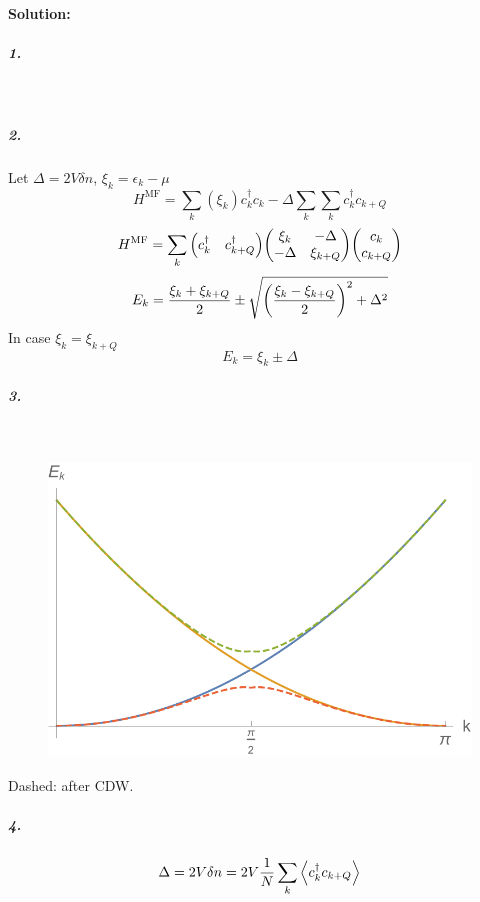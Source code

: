 \documentclass[a4paper]{article}
\DeclareMathOperator{\MF}{\text{MF}}
\numberwithin{equation}{section}
\begin{document}
\paragraph{Solution:}
\subparagraph{1.}
~\vspace{70pt}\\
\subparagraph{2.}
Let $ \Delta = 2V\delta n $, $ \xi_k = \epsilon_k - \mu $
\begin{equation}\label{key}
	H^{\MF} = \sum_k (\xi_k) c_k^\dagger c_k - \Delta \sum_k  \sum_k c_k^\dagger c_{k+Q}
\end{equation}
\begin{equation}\label{key}
	H^{\MF} = \sum_k \mqty(c_k^\dagger & c_{k+Q}^\dagger) 
		\mqty(\xi_k & -\Delta\\ - \Delta & \xi_{k+Q} ) 
		\mqty(c_k \\ c_{k+Q}) 
\end{equation}
\begin{equation}\label{key}
	E_k = \dfrac{\xi_k + \xi_{k+Q}}{2} \pm \sqrt{\qty( \dfrac{\xi_k - \xi_{k+Q}}{2} )^2 + \Delta^2}
\end{equation}
In case $ \xi_k = \xi_{k+Q} $
\begin{equation}\label{key}
	E_k = \xi_k \pm \Delta
\end{equation}
\newpage
\subparagraph{3.}~\\
\begin{figure}[H]
	\includegraphics[width=0.6\linewidth]{Ek.pdf}
\end{figure}
Dashed: after CDW.

\subparagraph{4.}
\begin{equation}\label{key}
\Delta = 2V \delta n = 2V \dfrac{1}{N} \sum_k \ev{c_k^\dagger  c_{k+Q}}
\end{equation}
\end{document}
